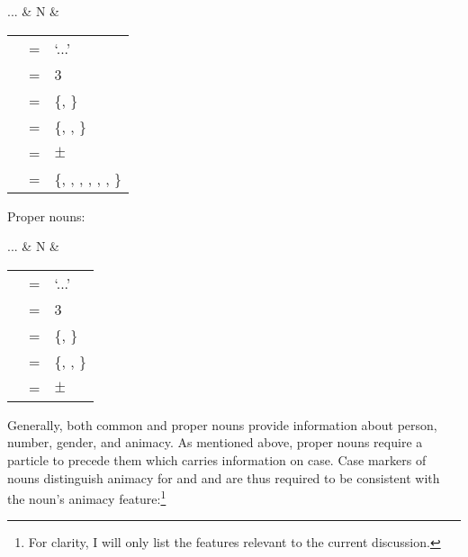 	\begin{tabu} {}
	...
		& N
		& \begin{tabular}[t]{l l l}
			\ups{\Pred} & = & `...' \\
			\ups{\Pers} & = & 3 \\
			\ups{\Num} & = & \{\Sg{}, \Pl{}\} \\
			\ups{\Gend} & = & \{\M{}, \F{}, \N{}\} \\
			\ups{\Anim} & = & $\pm$ \\
			\ups{\Case} & = & \{\Aarg{}, \Parg{}, \Dat{}, \Gen{}, 
				\Loc{}, \Ins{}, \Caus{}\} \\
		\end{tabular}
	\end{tabu}

\a Proper nouns:\\

	\begin{tabu} {}
	...
		& N
		& \begin{tabular}[t]{l l l}
			\ups{\Pred} & = & `...' \\
			\ups{\Pers} & = & 3 \\
			\ups{\Num} & = & \{\Sg{}, \Pl{}\} \\
			\ups{\Gend} & = & \{\M{}, \F{}, \N{}\} \\
			\ups{\Anim} & = & $\pm$ \\
		\end{tabular}
	\end{tabu}

\xe

Generally, both common and proper nouns provide information about person, 
number, gender, and animacy. As mentioned above, proper nouns require a 
particle to precede them which carries information on case. Case markers of 
nouns distinguish animacy for \Aarg{} and \Parg{} and are thus required to be 
consistent with the noun's animacy feature:\footnote{For clarity, I will only 
list the features relevant to the current discussion.}

